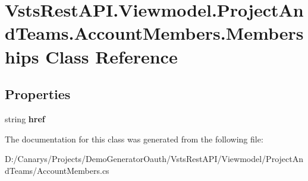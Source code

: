 \hypertarget{class_vsts_rest_a_p_i_1_1_viewmodel_1_1_project_and_teams_1_1_account_members_1_1_memberships}{}\section{Vsts\+Rest\+A\+P\+I.\+Viewmodel.\+Project\+And\+Teams.\+Account\+Members.\+Memberships Class Reference}
\label{class_vsts_rest_a_p_i_1_1_viewmodel_1_1_project_and_teams_1_1_account_members_1_1_memberships}
\subsection*{Properties}
\begin{DoxyCompactItemize}
\item 
\mbox{\label{class_vsts_rest_a_p_i_1_1_viewmodel_1_1_project_and_teams_1_1_account_members_1_1_memberships_a1f58f3047c337c46d5008d24eb6a5b6a}} 
string {\bfseries href}
\end{DoxyCompactItemize}


The documentation for this class was generated from the following file\+:\begin{DoxyCompactItemize}
\item 
D\+:/\+Canarys/\+Projects/\+Demo\+Generator\+Oauth/\+Vsts\+Rest\+A\+P\+I/\+Viewmodel/\+Project\+And\+Teams/Account\+Members.\+cs\end{DoxyCompactItemize}
